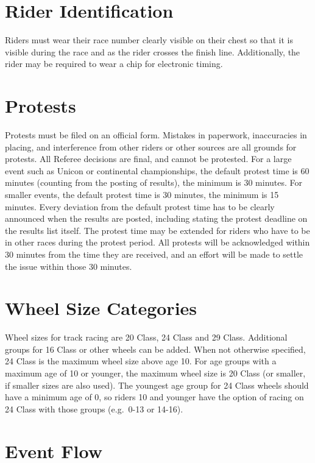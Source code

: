\section{Rider Identification}

Riders must wear their race number clearly visible on their chest so that it is visible during the race and as the rider crosses the finish line.
Additionally, the rider may be required to wear a chip for electronic timing.

\section{Protests}

Protests must be filed on an official form.
Mistakes in paperwork, inaccuracies in placing, and interference from other riders or other sources are all grounds for protests.
All Referee decisions are final, and cannot be protested.
For a large event such as Unicon or continental championships, the default protest time is 60 minutes (counting from the posting of results), the minimum is 30 minutes.
For smaller events, the default protest time is 30 minutes, the minimum is 15 minutes.
Every deviation from the default protest time has to be clearly announced when the results are posted, including stating the protest deadline on the results list itself.
The protest time may be extended for riders who have to be in other races during the protest period.
All protests will be acknowledged within 30 minutes from the time they are received, and an effort will be made to settle the issue within those 30 minutes.

\section{Wheel Size Categories}

Wheel sizes for track racing are 20 Class, 24 Class and 29 Class.
Additional groups for 16 Class or other wheels can be added.
When not otherwise specified, 24 Class is the maximum wheel size above age 10.
For age groups with a maximum age of 10 or younger, the maximum wheel size is 20 Class (or smaller, if smaller sizes are also used).
The youngest age group for 24 Class wheels should have a minimum age of 0, so riders 10 and younger have the option of racing on 24 Class with those groups (e.g.\ 0-13 or 14-16).

\section{Event Flow}


